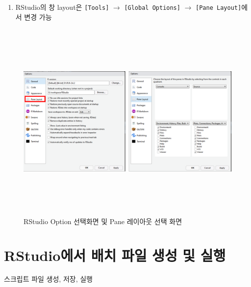 \documentclass[11pt,a4paper]{book}
\providecommand{\tightlist}{%
  \setlength{\itemsep}{0pt}\setlength{\parskip}{0pt}}
\theoremstyle{definition}
\theoremstyle{definition}
\theoremstyle{definition}
\theoremstyle{remark}
\begin{document}
\begin{enumerate}
\def\labelenumi{\arabic{enumi}.}
\setcounter{enumi}{4}
\tightlist
\item
  RStudio의 창 layout은 \texttt{{[}Tools{]}} \(\rightarrow\)
  \texttt{{[}Global\ Options{]}} \(\rightarrow\)
  \texttt{{[}Pane\ Layout{]}}에서 변경 가능
\end{enumerate}

\begin{figure}[H] {
  \centering
  \includegraphics[width = 15cm, height = 10cm]{Figures/RStudio-layout.png}
  \caption[RStudio Option 선택화면 및 Pane 레이아웃 선택 화면]{RStudio Option 선택화면 및 Pane 레이아웃 선택 화면}\label{fig:Rstudio-layout}
} \end{figure}

\section{RStudio에서 배치 파일 생성 및 실행}\label{rstudio-----}

스크립트 파일 생성, 저장, 실행
\end{document}

